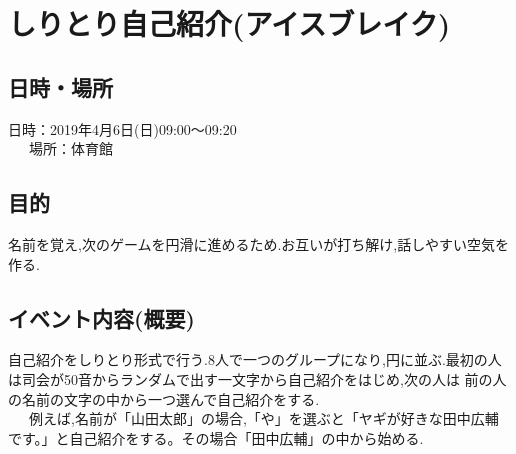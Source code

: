 \section{しりとり自己紹介(アイスブレイク)}
\subsection{日時・場所}
日時：2019年4月6日(日)09:00〜09:20\\
\ \ \ 場所：体育館\\

\subsection{目的}
名前を覚え,次のゲームを円滑に進めるため.お互いが打ち解け,話しやすい空気を作る.
\subsection{イベント内容(概要)}
自己紹介をしりとり形式で行う.8人で一つのグループになり,円に並ぶ.最初の人は司会が50音からランダムで出す一文字から自己紹介をはじめ,次の人は
前の人の名前の文字の中から一つ選んで自己紹介をする.\\
\ \ \ 例えば,名前が「山田太郎」の場合,「や」を選ぶと「ヤギが好きな田中広輔です。」と自己紹介をする。その場合「田中広輔」の中から始める.
